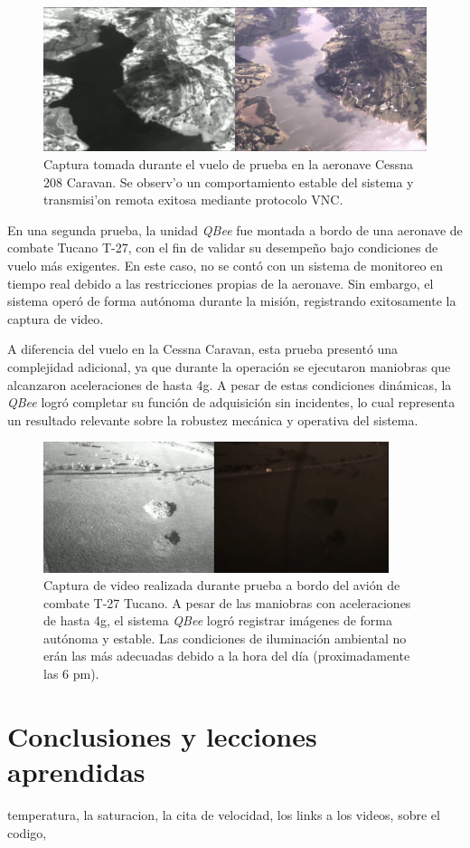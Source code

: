    \begin{figure}[!h]
    \centering
    \includegraphics[width=1\textwidth]{Figures/C4/vuelo_caravan.png}
    \caption{Captura tomada durante el vuelo de prueba en la aeronave Cessna 208 Caravan. Se observ'o un comportamiento estable del sistema y transmisi'on remota exitosa mediante protocolo VNC.}
    \label{fig:prueba_vuelo}
    \end{figure}

    \noindent En una segunda prueba, la unidad \textit{QBee} fue montada a bordo de una aeronave de combate Tucano T-27, con el fin de validar su desempeño bajo condiciones de vuelo más exigentes. En este caso, no se contó con un sistema de monitoreo en tiempo real debido a las restricciones propias de la aeronave. Sin embargo, el sistema operó de forma autónoma durante la misión, registrando exitosamente la captura de video.

    \noindent A diferencia del vuelo en la Cessna Caravan, esta prueba presentó una complejidad adicional, ya que durante la operación se ejecutaron maniobras que alcanzaron aceleraciones de hasta 4g. A pesar de estas condiciones dinámicas, la \textit{QBee} logró completar su función de adquisición sin incidentes, lo cual representa un resultado relevante sobre la robustez mecánica y operativa del sistema.
    
    \begin{figure}[!h]
    \centering
    \includegraphics[width=0.9\textwidth]{Figures/C4/t2.png}
    \caption{Captura de video realizada durante prueba a bordo del avión de combate T-27 Tucano. A pesar de las maniobras con aceleraciones de hasta 4g, el sistema \textit{QBee} logró registrar imágenes de forma autónoma y estable. Las condiciones de iluminación ambiental no erán las más adecuadas debido a la hora del día (proximadamente las 6 pm).}
    \label{fig:prueba_tucano}
    \end{figure}

    \section{Conclusiones y lecciones aprendidas}

    temperatura, la saturacion, la cita de velocidad, los links a los videos, sobre el codigo, 
